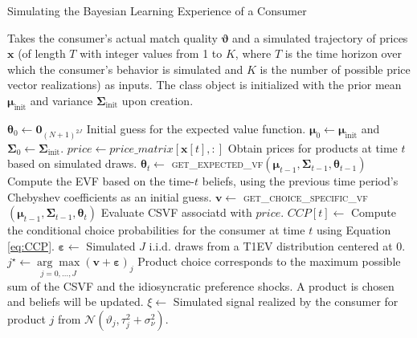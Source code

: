 \documentclass[11pt]{article}
\newcommand{\N}{\mathcal{N}}
\begin{document}
\newpage
\null
\vfill
\begin{algorithm}[!htpb]
	\caption{Simulating the Bayesian Learning Experience of a Consumer} \label{alg_bayes}
    \vspace{1em} 
	Takes the consumer's actual match quality $\boldsymbol{\vartheta}$ and a simulated trajectory of prices $\boldsymbol{x}$ (of length $T$ with integer values from 1 to $K$, where $T$ is the time horizon over which the consumer's behavior is simulated and $K$ is the number of possible price vector realizations) as inputs. The class object is initialized with the prior mean $\boldsymbol{\mu}_{\text{init}}$ and variance $\boldsymbol{\Sigma}_{\text{init}}$ upon creation. \vspace{1em} 
    \begin{onehalfspace}
	\begin{algorithmic}[1]
    \State $\boldsymbol{\theta}_0 \gets \boldsymbol{0}_{{(N + 1)}^{2J}}$ Initial guess for the expected value function.
    \State $\boldsymbol{\mu}_{0} \gets \boldsymbol{\mu}_{\text{init}}$ and $\boldsymbol{\Sigma}_{0} \gets \boldsymbol{\Sigma}_{\text{init}}$.
     
    \State $price \gets price\_matrix[\boldsymbol{x}[t], :]$ Obtain prices for products at time $t$ based on simulated draws.
    \State $\boldsymbol{\theta}_{t} \gets $ \textsc{get\_expected\_vf}$\left(\boldsymbol{\mu}_{t-1}, \boldsymbol{\Sigma}_{t-1}, \boldsymbol{\theta}_{t-1} \right)$ Compute the EVF based on the time-$t$ beliefs, using the previous time period's Chebyshev coefficients as an initial guess. 
    \State $\boldsymbol{v} \gets $ \textsc{get\_choice\_specific\_vf} $\left( \boldsymbol{\mu}_{t-1}, \boldsymbol{\Sigma}_{t-1}, \boldsymbol{\theta}_{t} \right)$ Evaluate CSVF associatd with $price$.
    \State $CCP[t] \gets $ Compute the conditional choice probabilities for the consumer at time $t$ using Equation \ref{eq:CCP}.
    \State $\boldsymbol{\varepsilon} \gets $ Simulated $J$ i.i.d. draws from a T1EV distribution centered at $0$.  
    \State $j^\star \gets \underset{j = 0, \dots, J}{\arg\max} \left(\boldsymbol{v} + \boldsymbol{\varepsilon} \right)_{j}$ Product choice corresponds to the maximum possible sum of the CSVF and the idiosyncratic preference shocks.
     A product is chosen and beliefs will be updated.
        \State $\xi \gets $ Simulated signal realized by the consumer for product $j$ from $ \N(\vartheta_j, \tau^2_{j} + \sigma^2_\nu)$.

\end{algorithmic}
\end{onehalfspace}
\end{algorithm}
\end{document}
